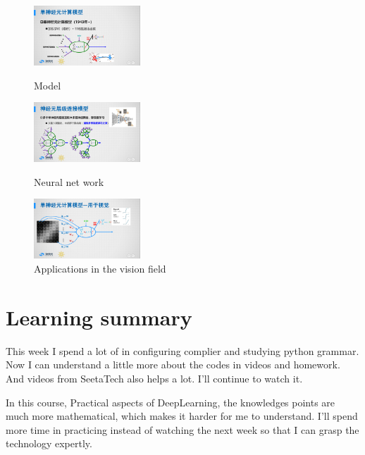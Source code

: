 \documentclass{article}
\begin{document}
\begin{figure}[htbp]

\begin{minipage}[t]{0.3\linewidth}
\centering
\includegraphics[width=4cm]{model.png}
\caption{Model}
\label{model}
\end{minipage}
\hfill
\begin{minipage}[t]{0.3\linewidth}
\centering
\includegraphics[width=4cm]{neural_net_work.png}
\caption{Neural net work}
\label{neuralnetwork}
\end{minipage}
\hfill
\begin{minipage}[t]{0.3\linewidth}
\centering
\includegraphics[width=4cm]{vision.png}
\caption{Applications in the vision field}
\label{vision}
\end{minipage}

\end{figure}

\section*{Learning summary}
This week I spend a lot of in configuring complier and studying python grammar. Now I can understand a little more about the codes in videos and homework. And videos from SeetaTech also helps a lot. I'll continue to watch it.\par
In this course, Practical aspects of DeepLearning, the knowledges points are much more mathematical, which makes it harder for me to understand. I'll spend more time in practicing instead of watching the next week so that I can grasp the technology expertly.
\end{document}
